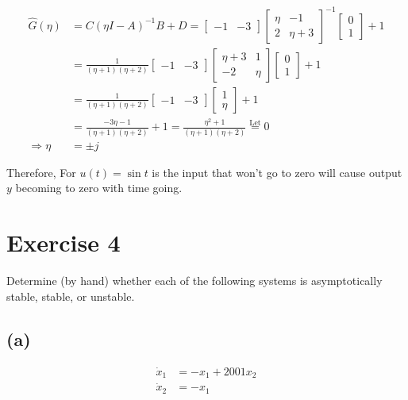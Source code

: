 \documentclass[12pt,a4paper]{article}
\begin{document}
	\begin{align*}
		\hat{G}(\eta) &= C(\eta I - A)^{-1}B + D = \begin{bmatrix}
			-1 & -3
		\end{bmatrix} \begin{bmatrix}
			\eta & -1 \\ 2 & \eta + 3
		\end{bmatrix}^{-1} \begin{bmatrix}
			0 \\ 1
		\end{bmatrix} + 1 \\
		&= \frac{1}{(\eta + 1)(\eta + 2)}\begin{bmatrix}
			-1 & -3
		\end{bmatrix} \begin{bmatrix}
			\eta + 3 & 1 \\ -2 & \eta 
		\end{bmatrix} \begin{bmatrix}
			0 \\ 1
		\end{bmatrix} + 1 \\
		&= \frac{1}{(\eta + 1)(\eta + 2)} \begin{bmatrix}
			-1 & -3
		\end{bmatrix}\begin{bmatrix}
			1 \\ \eta
		\end{bmatrix} + 1 \\
		&= \frac{-3\eta - 1}{(\eta + 1)(\eta + 2)} + 1 = \frac{\eta^2 + 1}{(\eta + 1)(\eta + 2)} \overset{\text{Let}}{=} 0  \\ \Rightarrow \eta &= \pm j
	\end{align*}

	Therefore, For $u(t) = \sin t$ is the input that won't go to zero will cause output $y$ becoming to zero with time going.
	
	\section*{Exercise 4}
	Determine (by hand) whether each of the following systems is asymptotically stable, stable, or unstable.
	
	\subsection*{(a)}
	\begin{align*}
		\dot{x}_{1} &= -x_{1}+2001x_{2} \\
		\dot{x}_{2} &= -x_{1}
	\end{align*}
	
\end{document}
